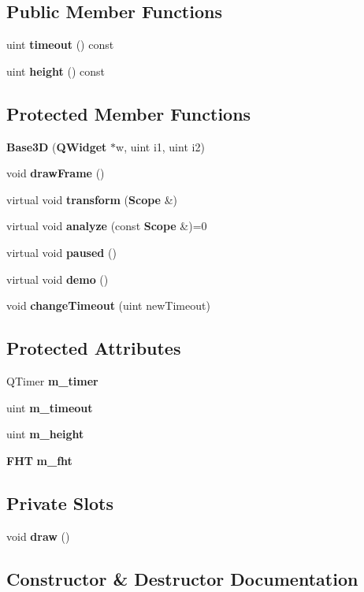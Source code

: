 \subsection*{Public Member Functions}
\begin{CompactItemize}
\item 
uint {\bf timeout} () const
\item 
uint {\bf height} () const
\end{CompactItemize}
\subsection*{Protected Member Functions}
\begin{CompactItemize}
\item 
{\bf Base3D} ({\bf QWidget} $\ast$w, uint i1, uint i2)
\item 
void {\bf draw\-Frame} ()
\item 
virtual void {\bf transform} ({\bf Scope} \&)
\item 
virtual void {\bf analyze} (const {\bf Scope} \&)=0
\item 
virtual void {\bf paused} ()
\item 
virtual void {\bf demo} ()
\item 
void {\bf change\-Timeout} (uint new\-Timeout)
\end{CompactItemize}
\subsection*{Protected Attributes}
\begin{CompactItemize}
\item 
QTimer {\bf m\_\-timer}
\item 
uint {\bf m\_\-timeout}
\item 
uint {\bf m\_\-height}
\item 
{\bf FHT} {\bf m\_\-fht}
\end{CompactItemize}
\subsection*{Private Slots}
\begin{CompactItemize}
\item 
void {\bf draw} ()
\end{CompactItemize}


\subsection{Constructor \& Destructor Documentation}
